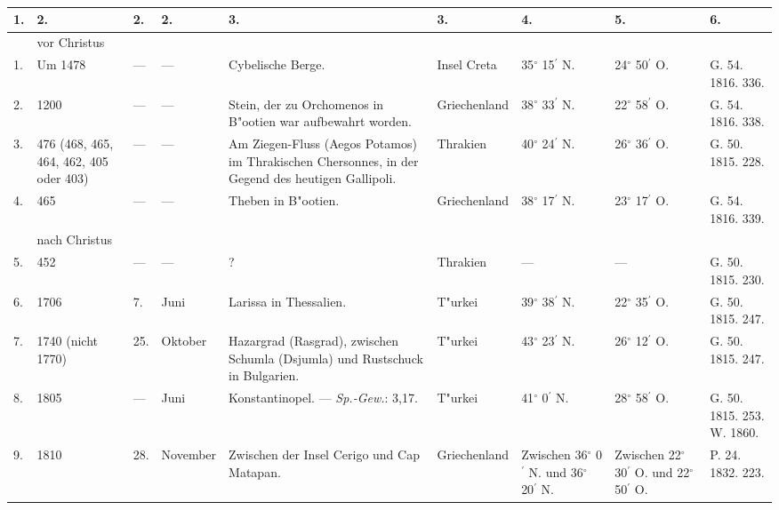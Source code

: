 \documentclass[a4paper, 8pt, oneside, polutonikogreek, german]{article}
\begin{document}
\subsubsection{}
\begin{center}
    \footnotesize
    \begin{longtable}{|p{3mm}|p{12mm}|p{5mm}|p{13mm}|p{25mm}|p{15mm}|p{10mm}|p{10mm}|p{11mm}|}
    \hline
        1. & 2. & 2. & 2. & 3. & 3. & 4. & 5. & 6. \\ \hline
          & vor Christus &   &   &   &   &   &   &   \\ \hline
        1. & Um 1478 & --- & --- & Cybelische Berge. & Insel Creta & 35$^\circ$ 15$^\prime$ N. & 24$^\circ$ 50$^\prime$ O. & G. 54. 1816. 336. \\ \hline
        2. & 1200 & --- & --- & Stein, der zu Orchomenos in B"ootien war aufbewahrt worden. & Griechenland & 38$^\circ$ 33$^\prime$ N. & 22$^\circ$ 58$^\prime$ O. & G. 54. 1816. 338. \\ \hline
        3. & 476 (468, 465, 464, 462, 405 oder 403) & --- & --- & Am Ziegen-Fluss (Aegos Potamos) im Thrakischen Chersonnes, in der Gegend des heutigen Gallipoli. & Thrakien & 40$^\circ$ 24$^\prime$ N. & 26$^\circ$ 36$^\prime$ O. & G. 50. 1815. 228. \\ \hline
        4. & 465 & --- & --- & Theben in B"ootien. & Griechenland & 38$^\circ$ 17$^\prime$ N. & 23$^\circ$ 17$^\prime$ O. & G. 54. 1816. 339. \\ \hline
          & nach Christus &   &   &   &   &   &   &   \\ \hline
        5. & 452 & --- & --- & ? & Thrakien & --- & --- & G. 50. 1815. 230. \\ \hline
        6. & 1706 & 7. & Juni & Larissa in Thessalien. & T"urkei & 39$^\circ$ 38$^\prime$ N. & 22$^\circ$ 35$^\prime$ O. & G. 50. 1815. 247. \\ \hline
        7. & 1740 (nicht 1770) & 25. & Oktober & Hazargrad (Rasgrad), zwischen Schumla (Dsjumla) und Rustschuck in Bulgarien. & T"urkei & 43$^\circ$ 23$^\prime$ N. & 26$^\circ$ 12$^\prime$ O. & G. 50. 1815. 247. \\ \hline
        8. & 1805 & --- & Juni & Konstantinopel. --- \emph{Sp.-Gew.}: 3,17. & T"urkei & 41$^\circ$ 0$^\prime$ N. & 28$^\circ$ 58$^\prime$ O. & G. 50. 1815. 253. W. 1860. \\ \hline
        9. & 1810 & 28. & November & Zwischen der Insel Cerigo und Cap Matapan. & Griechenland & Zwischen 36$^\circ$ 0$^\prime$ N. und 36$^\circ$ 20$^\prime$ N. & Zwischen 22$^\circ$ 30$^\prime$ O. und 22$^\circ$ 50$^\prime$ O. & P. 24. 1832. 223. \\ \hline

\end{longtable}
\end{center}
\end{document}

